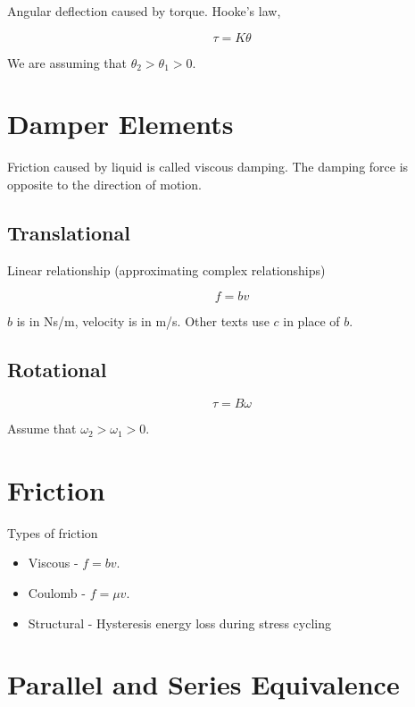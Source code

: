 \documentclass[12pt, a4paper]{report}
\begin{document}
  Angular deflection caused by torque. Hooke's law,

  \begin{equation}
    \tau = K\theta
  \end{equation}

  We are assuming that $ \theta_2 > \theta_1 > 0. $

  \section{Damper Elements}

  Friction caused by liquid is called viscous damping. The damping force is opposite to the direction of motion.

  \subsection{Translational}

  Linear relationship (approximating complex relationships)

  \begin{equation}
    f = bv
  \end{equation}

  $ b $ is in Ns/m, velocity is in m/s. Other texts use $ c $ in place of $ b. $

  \subsection{Rotational}

  \begin{equation}
    \tau = B \omega
  \end{equation}

  Assume that $ \omega_2 > \omega_1 > 0. $

  \section{Friction}

  Types of friction

  \begin{itemize}
    \item Viscous - $ f = bv. $
    \item Coulomb - $ f = \mu v. $
    \item Structural - Hysteresis energy loss during stress cycling
  \end{itemize}

  \section{Parallel and Series Equivalence}
\end{document}
